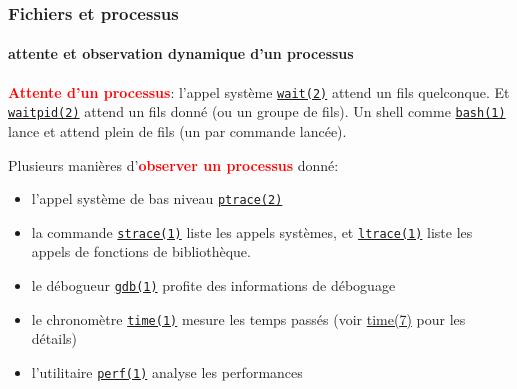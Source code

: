 \documentclass[xcolor=svgnames,final,smaller,a4]{beamer}
\begin{document}
\begin{frame}
  \frametitle{Fichiers et processus}
  \framesubtitle{attente et observation dynamique d'un processus}

  \textbf{\textcolor{red}{Attente d'un processus}}: l'appel système
  \href{https://man7.org/linux/man-pages/man2/wait.2.html}{\texttt{wait(2)}}
  attend un fils quelconque. Et
  \href{https://man7.org/linux/man-pages/man2/waitpid.2.html}{\texttt{waitpid(2)}}
  attend un fils donné (ou un groupe de fils). Un shell comme \href{https://man7.org/linux/man-pages/man1/bash.1.html}{\texttt{bash(1)}} lance et attend plein de fils (un par commande lancée).


  \vspace{0.4cm}
  
  Plusieurs manières d'\textbf{\textcolor{red}{observer un processus}} donné:

  \begin{itemize}

  \item l'appel système de bas niveau \href{https://man7.org/linux/man-pages/man2/ptrace.2.html}{\texttt{ptrace(2)}}
 
    
  \item la commande
    \href{https://man7.org/linux/man-pages/man1/strace.1.html}{\texttt{strace(1)}}
    liste les appels systèmes, et
    \href{https://man7.org/linux/man-pages/man1/ltrace.1.html}{\texttt{ltrace(1)}}
    liste les appels de fonctions de bibliothèque.

    \item le débogueur 
    \href{https://man7.org/linux/man-pages/man1/gdb.1.html}{\texttt{gdb(1)}} profite des informations de déboguage
    
    \item le chronomètre 
    \href{https://man7.org/linux/man-pages/man1/time.1.html}{\texttt{time(1)}} mesure les temps passés  (voir 
  \href{https://man7.org/linux/man-pages/man7/time.7.html}{time(7)} pour les détails)
    
    \item l'utilitaire 
    \href{https://man7.org/linux/man-pages/man1/perf.1.html}{\texttt{perf(1)}} analyse les performances
    
  \end{itemize}
  
\end{frame}
\end{document}
